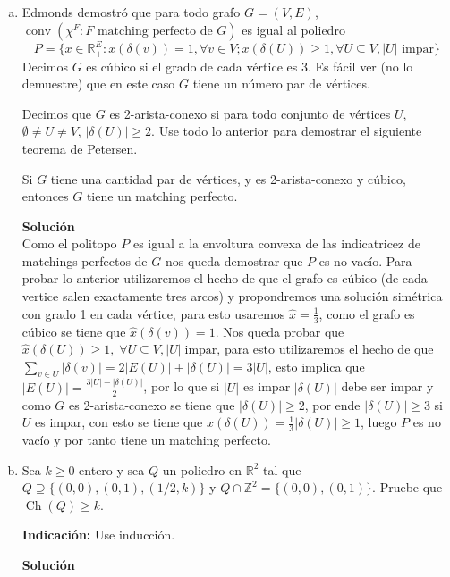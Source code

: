 \documentclass{article}
\newcommand{\RR}{\mathbb R}
\newcommand{\ZZ}{\mathbb Z}
\newcommand{\conv}{\operatorname{conv}}
\newcommand{\Ch}{\operatorname{Ch}}
\theoremstyle{plain}
\theoremstyle{definition}
\theoremstyle{Azul}
\begin{document}
\begin{enumerate}[(a)]
\item Edmonds demostró que para todo grafo $G=(V,E)$, 
$\conv(\chi^F\colon F \text{ matching perfecto de $G$})$ es igual al poliedro $$P =\{x\in\mathbb{R}^E_+\colon x(\delta(v))=1, \forall v\in V; x(\delta(U))\geq 1, \forall U\subseteq V, |U|\text{ impar}\}$$
Decimos $G$ es cúbico si el grado de cada vértice es 3. Es fácil ver (no lo demuestre) que en este caso $G$ tiene un número par de vértices.

Decimos que $G$ es 2-arista-conexo si para todo conjunto de vértices $U$, $\emptyset\neq U\neq V$, $|\delta(U)|\geq 2$. Use todo lo anterior para demostrar el siguiente teorema de Petersen.

Si $G$ tiene una cantidad par de vértices, y es 2-arista-conexo y cúbico, entonces $G$ tiene un matching perfecto.

\textbf{Solución}\\

Como el politopo $P$ es igual a la envoltura convexa de las indicatricez de matchings perfectos de $G$ nos queda demostrar que $P$ es no vacío. Para probar lo anterior utilizaremos el hecho de que el grafo es cúbico (de cada vertice salen exactamente tres arcos) y propondremos una solución simétrica con grado 1 en cada vértice, para esto usaremos $\hat{x}=\frac{1}{3}$, como el grafo es cúbico se tiene que $\hat{x}(\delta(v))=1$. Nos queda probar que $\hat{x}(\delta(U))\geq 1, \; \forall U \subseteq V, |U| \;\text{impar}$, para esto utilizaremos el hecho de que $\sum_{v\in U}|\delta(v)| = 2|E(U)|+|\delta(U)| = 3|U|$, esto implica que $|E(U)|=\frac{3|U|-|\delta(U)|}{2}$, por lo que si $|U|$ es impar $|\delta(U)|$ debe ser impar y como $G$ es 2-arista-conexo se tiene que $|\delta(U)|\geq 2$, por ende $|\delta(U)|\geq 3$ si $U$ es impar, con esto se tiene que $x(\delta(U))=\frac{1}{3}|\delta(U)|\geq 1$, luego $P$ es no vacío y por tanto tiene un matching perfecto.

\item 
Sea $k\geq 0$ entero y sea $Q$ un poliedro en $\RR^2$ tal que $Q\supseteq \{(0,0),(0,1),(1/2,k)\}$ y $Q\cap \ZZ^2=\{(0,0),(0,1)\}$. Pruebe que $\Ch(Q)\geq k$.

\textbf{Indicación:} Use inducción.

\textbf{Solución}\\


\end{enumerate}
\end{document}
